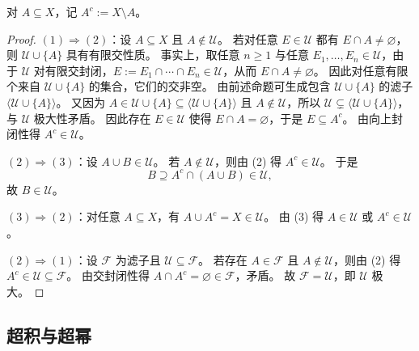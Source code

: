 \documentclass[lang=cn,a4paper,newtx,section]{elegantbook}
\begin{document}
\begin{remark}
对 $A\subseteq X$，记 $A^{c}:=X\setminus A$。
\end{remark}

\begin{proof}
$(1)\Rightarrow(2)$：设 $A\subseteq X$ 且 $A\notin\mathcal U$。
若对任意 $E\in\mathcal U$ 都有 $E\cap A\neq\varnothing$，则 $\mathcal U\cup\{A\}$ 具有有限交性质。
事实上，取任意 $n\ge 1$ 与任意 $E_1,\dots,E_n\in\mathcal U$，由于 $\mathcal U$ 对有限交封闭，$E:=E_1\cap\cdots\cap E_n\in\mathcal U$，从而 $E\cap A\neq\varnothing$。
因此对任意有限个来自 $\mathcal U\cup\{A\}$ 的集合，它们的交非空。
由前述命题可生成包含 $\mathcal U\cup\{A\}$ 的滤子 $\langle\mathcal U\cup\{A\}\rangle$。
又因为 $A\in\mathcal U\cup\{A\}\subseteq\langle\mathcal U\cup\{A\}\rangle$ 且 $A\notin\mathcal U$，所以 $\mathcal U\subsetneq\langle\mathcal U\cup\{A\}\rangle$，与 $\mathcal U$ 极大性矛盾。
因此存在 $E\in\mathcal U$ 使得 $E\cap A=\varnothing$，于是 $E\subseteq A^{c}$。
由向上封闭性得 $A^{c}\in\mathcal U$。

$(2)\Rightarrow(3)$：设 $A\cup B\in\mathcal U$。
若 $A\notin\mathcal U$，则由 (2) 得 $A^{c}\in\mathcal U$。
于是
\[
  B\supseteq A^{c}\cap(A\cup B)\in\mathcal U,
\]
故 $B\in\mathcal U$。

$(3)\Rightarrow(2)$：对任意 $A\subseteq X$，有 $A\cup A^{c}=X\in\mathcal U$。
由 (3) 得 $A\in\mathcal U$ 或 $A^{c}\in\mathcal U$。

$(2)\Rightarrow(1)$：设 $\mathcal F$ 为滤子且 $\mathcal U\subseteq\mathcal F$。
若存在 $A\in\mathcal F$ 且 $A\notin\mathcal U$，则由 (2) 得 $A^{c}\in\mathcal U\subseteq\mathcal F$。
由交封闭性得 $A\cap A^{c}=\varnothing\in\mathcal F$，矛盾。
故 $\mathcal F=\mathcal U$，即 $\mathcal U$ 极大。
\end{proof}

\subsection{超积与超幂}
\end{document}

